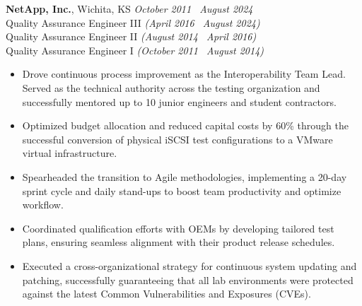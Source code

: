 \documentclass[10pt]{article}       %
\begin{document}
\textbf{NetApp, Inc.}, Wichita, KS \hfill \textit{October 2011 \textendash\ August 2024} \\
\vspace{1pt}
Quality Assurance Engineer III \textit{(April 2016 \textendash\ August 2024)} \\
Quality Assurance Engineer II \textit{(August 2014 \textendash\ April 2016)} \\
Quality Assurance Engineer I \textit{(October 2011 \textendash\ August 2014)} \\
\begin{itemize}
  \item Drove continuous process improvement as the Interoperability Team Lead. Served as the technical authority across the testing organization and successfully mentored up to 10 junior engineers and student contractors.
  \item Optimized budget allocation and reduced capital costs by 60\% through the successful conversion of physical iSCSI test configurations to a VMware virtual infrastructure.
  \item Spearheaded the transition to Agile methodologies, implementing a 20-day sprint cycle and daily stand-ups to boost team productivity and optimize workflow.
  \item Coordinated qualification efforts with OEMs by developing tailored test plans, ensuring seamless alignment with their product release schedules.
  \item Executed a cross-organizational strategy for continuous system updating and patching, successfully guaranteeing that all lab environments were protected against the latest Common Vulnerabilities and Exposures (CVEs).

\end{itemize}
\end{document}
